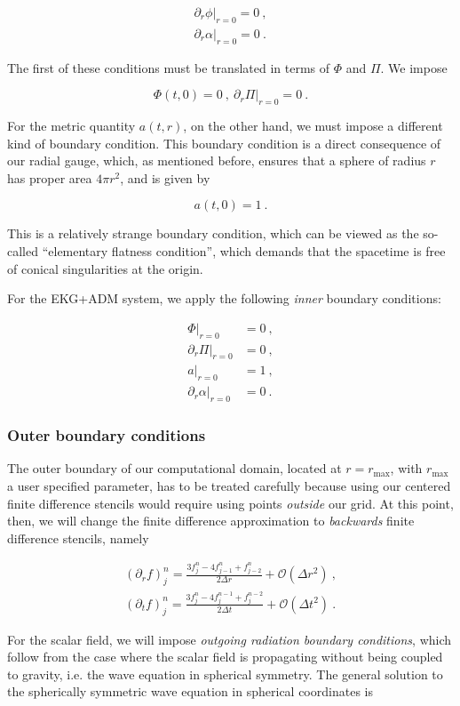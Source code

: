 \documentclass[a4paper,11pt]{article}
\renewcommand{\a}{\alpha}
\newcommand{\pd}{\partial}
\newcommand{\nn}{\nonumber}
\newcommand{\dt}{\Delta t}
\newcommand{\dr}{\Delta r}
\newcommand{\order}[2]{\mathcal{O}\lrpar{#1^{#2}}}
\newcommand{\lrpar}[1]{\left( #1 \right)}
\newcommand{\n}{\noindent}
\newcommand{\eq}[1]{
  \begin{equation}
    #1
  \end{equation}
}
\newcommand{\spl}[1]{
  \begin{split}
    #1
  \end{split}
}
\newcommand{\al}[1]{
  \begin{align}
    #1
  \end{align}
}
\renewcommand{\parbox}[2]{

  \vspace*{0.25in}
  
  \begin{tcolorbox}[title=Box #1,colback=blue!5!white,colframe=gray!75!black]
    #2
  \end{tcolorbox}

  \vspace*{0.25in}

}
\begin{document}
\al{
  \left.\pd_{r}\phi\right|_{r=0} = 0\ ,\\
  \left.\pd_{r}\a\right|_{r=0} = 0\ .
}

\n The first of these conditions must be translated in terms of $\Phi$ and $\Pi$. We impose

\eq{
  \Phi(t,0) = 0\ ,\ \left.\pd_{r}\Pi\right|_{r=0} = 0\ .
}

For the metric quantity $a(t,r)$, on the other hand, we must impose a different kind of boundary condition. This boundary condition is a direct consequence of our radial gauge, which, as mentioned before, ensures that a sphere of radius $r$ has proper area $4\pi r^{2}$, and is given by

\eq{ a(t,0) = 1\ . }

\n This is a relatively strange boundary condition, which can be viewed as the so-called ``elementary flatness condition'', which demands that the spacetime is free of conical singularities at the origin.

\parbox{4: EKG+ADM -- Inner boundary conditions}{
  For the EKG+ADM system, we apply the following \emph{inner} boundary conditions:
  \al{
    \left.\Phi\right|_{r=0} &= 0\ ,\nn\\
    \left.\pd_{r}\Pi\right|_{r=0} &= 0\ ,\nn\\
    \left.a\right|_{r=0} &= 1\ ,\nn\\
    \left.\pd_{r}\a\right|_{r=0} &= 0\ .\nn
  }
}

\subsubsection{Outer boundary conditions}

The outer boundary of our computational domain, located at $r=r_{\max}$, with $r_{\max}$ a user specified parameter, has to be treated carefully because using our centered finite difference stencils would require using points \emph{outside} our grid. At this point, then, we will change the finite difference approximation to \emph{backwards} finite difference stencils, namely

\eq{
  \spl{
    \lrpar{\partial_{r}f}^{n}_{j} = \frac{3f^{n}_{j} - 4f^{n}_{j-1} + f^{n}_{j-2}}{2\dr} + \order{\dr}{2}\ ,\\
    \lrpar{\partial_{t}f}^{n}_{j} = \frac{3f^{n}_{j} - 4f^{n-1}_{j} + f^{n-2}_{j}}{2\dt} + \order{\dt}{2}\ .
  }
}

For the scalar field, we will impose \emph{outgoing radiation boundary conditions}, which follow from the case where the scalar field is propagating without being coupled to gravity, i.e. the wave equation in spherical symmetry. The general solution to the spherically symmetric wave equation in spherical coordinates is
\end{document}
